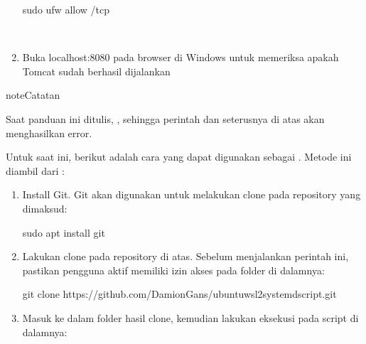 \documentclass[letterpaper,10pt,english]{sphinxmanual}
\begin{document}
\begin{enumerate}
\begin{sphinxVerbatim}[commandchars=\\\{\}]
sudo ufw allow /tcp
\end{sphinxVerbatim}

 

\item {} 
Buka localhost:8080 pada browser di Windows untuk memeriksa apakah Tomcat sudah berhasil dijalankan


\end{enumerate}

\begin{sphinxadmonition}{note}{Catatan}

Saat panduan ini ditulis, , sehingga perintah  dan seterusnya di atas akan menghasilkan error.

Untuk saat ini, berikut adalah cara yang dapat digunakan sebagai . Metode ini diambil dari :
\begin{enumerate}
%
\item {} 
Install Git. Git akan digunakan untuk melakukan clone pada repository yang dimaksud:

\begin{sphinxVerbatim}[commandchars=\\\{\}]
sudo apt install git
\end{sphinxVerbatim}

\item {} 
Lakukan clone pada repository di atas. Sebelum menjalankan perintah ini, pastikan pengguna aktif memiliki izin akses pada folder di dalamnya:

\begin{sphinxVerbatim}[commandchars=\\\{\}]
git clone https://github.com/DamionGans/ubuntu\PYGZhy{}wsl2\PYGZhy{}systemd\PYGZhy{}script.git
\end{sphinxVerbatim}

\item {} 
Masuk ke dalam folder hasil clone, kemudian lakukan eksekusi pada script di dalamnya:


\end{enumerate}
\end{sphinxadmonition}
\end{document}
